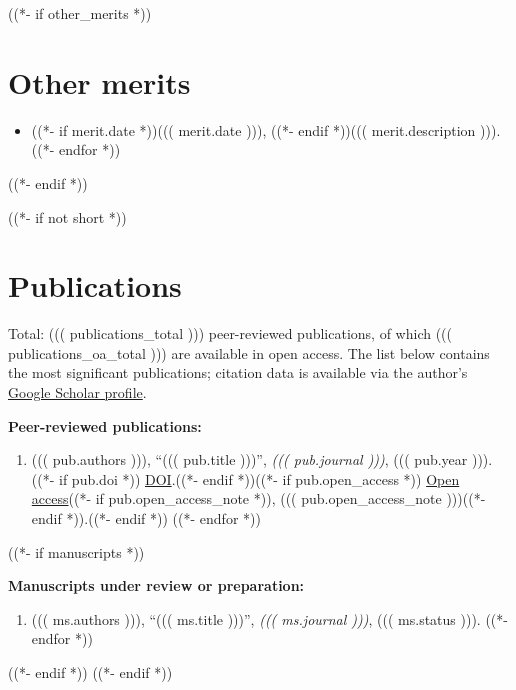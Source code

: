 \documentclass[a4paper,12pt]{article}
\begin{document}
((*- if other_merits *))
\section*{Other merits}

\begin{itemize}
((*- for merit in other_merits *))
\item ((*- if merit.date *))((( merit.date ))), ((*- endif *))((( merit.description ))).
((*- endfor *))
\end{itemize}
((*- endif *))

((*- if not short *))
\section*{Publications}

Total: ((( publications_total ))) peer-reviewed publications, of which ((( publications_oa_total ))) are available in open access. The list below contains the most significant publications; citation data is available via the author's \href{https://scholar.google.com/citations?user=FH4YQc8AAAAJ}{Google Scholar profile}. 

\textbf{Peer-reviewed publications:}
\begin{enumerate}
((*- for pub in publications *))
\item ((( pub.authors ))), ``((( pub.title )))'', \textit{((( pub.journal )))}, ((( pub.year ))).((*- if pub.doi *)) \href{((( pub.doi )))}{DOI}.((*- endif *))((*- if pub.open_access *)) \href{((( pub.open_access )))}{Open access}((*- if pub.open_access_note *)), ((( pub.open_access_note )))((*- endif *)).((*- endif *))
((*- endfor *))
\end{enumerate}
((*- if manuscripts *))

\textbf{Manuscripts under review or preparation:}
\begin{enumerate}
((*- for ms in manuscripts *))
\item ((( ms.authors ))), ``((( ms.title )))'', \textit{((( ms.journal )))}, ((( ms.status ))).
((*- endfor *))
\end{enumerate}
((*- endif *))
((*- endif *))

\label{lastpage}
\end{document}
